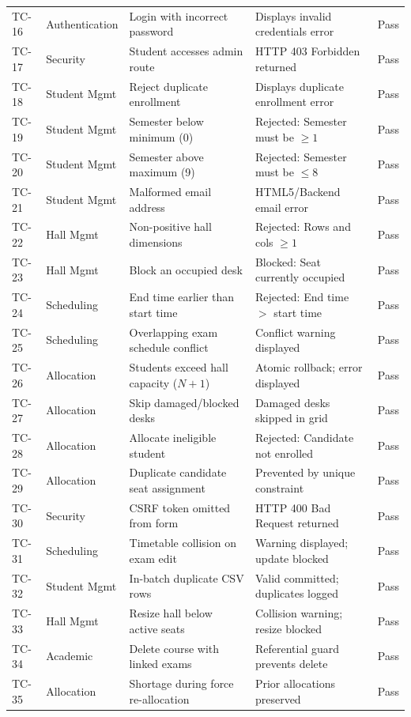 \documentclass{InternshipReport}
\begin{document}
\begin{longtable}{p{} p{} p{} p{} p{}}
TC-16 & Authentication & Login with incorrect password & Displays invalid credentials error & Pass \\
TC-17 & Security & Student accesses admin route & HTTP 403 Forbidden returned & Pass \\
TC-18 & Student Mgmt & Reject duplicate enrollment & Displays duplicate enrollment error & Pass \\
TC-19 & Student Mgmt & Semester below minimum (0) & Rejected: Semester must be $\ge 1$ & Pass \\
TC-20 & Student Mgmt & Semester above maximum (9) & Rejected: Semester must be $\le 8$ & Pass \\
TC-21 & Student Mgmt & Malformed email address & HTML5/Backend email error & Pass \\
TC-22 & Hall Mgmt & Non-positive hall dimensions & Rejected: Rows and cols $\ge 1$ & Pass \\
TC-23 & Hall Mgmt & Block an occupied desk & Blocked: Seat currently occupied & Pass \\
TC-24 & Scheduling & End time earlier than start time & Rejected: End time $>$ start time & Pass \\
TC-25 & Scheduling & Overlapping exam schedule conflict & Conflict warning displayed & Pass \\
TC-26 & Allocation & Students exceed hall capacity ($N+1$) & Atomic rollback; error displayed & Pass \\
TC-27 & Allocation & Skip damaged/blocked desks & Damaged desks skipped in grid & Pass \\
TC-28 & Allocation & Allocate ineligible student & Rejected: Candidate not enrolled & Pass \\
TC-29 & Allocation & Duplicate candidate seat assignment & Prevented by unique constraint & Pass \\
TC-30 & Security & CSRF token omitted from form & HTTP 400 Bad Request returned & Pass \\
TC-31 & Scheduling & Timetable collision on exam edit & Warning displayed; update blocked & Pass \\
TC-32 & Student Mgmt & In-batch duplicate CSV rows & Valid committed; duplicates logged & Pass \\
TC-33 & Hall Mgmt & Resize hall below active seats & Collision warning; resize blocked & Pass \\
TC-34 & Academic & Delete course with linked exams & Referential guard prevents delete & Pass \\
TC-35 & Allocation & Shortage during force re-allocation & Prior allocations preserved & Pass \\

\end{longtable}
\end{document}
